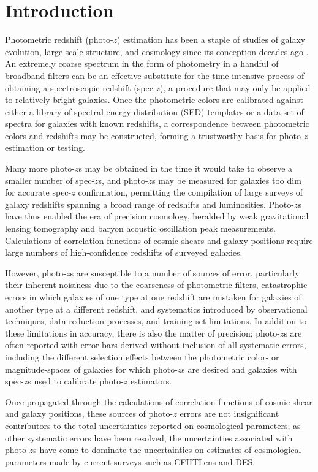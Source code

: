 \documentclass[preprint]{aastex}
\begin{document}
\section{Introduction}
\label{sec:intro}

Photometric redshift (photo-$z$) estimation has been a staple of studies of 
galaxy evolution, large-scale structure, and cosmology since its conception 
decades ago \citep{Baum1962}.  An extremely coarse spectrum in the form of 
photometry in a handful of broadband filters can be an effective substitute for 
the time-intensive process of obtaining a spectroscopic redshift (spec-$z$), a 
procedure that may only be applied to relatively bright galaxies.  Once the 
photometric colors are calibrated against either a library of spectral energy 
distribution (SED) templates or a data set of spectra for galaxies with known 
redshifts, a correspondence between photometric colors and redshifts may be 
constructed, forming a trustworthy basis for photo-$z$ estimation or testing.

Many more photo-$z$s may be obtained in the time it would take to observe a 
smaller number of spec-$z$s, and photo-$z$s may be measured for galaxies too 
dim for accurate spec-$z$ confirmation, permitting the compilation of large 
surveys of galaxy redshifts spanning a broad range of redshifts and 
luminosities.  Photo-$z$s have thus enabled the era of precision cosmology, 
heralded by weak gravitational lensing tomography and baryon acoustic 
oscillation peak measurements.  Calculations of correlation functions of cosmic 
shears and galaxy positions require large numbers of high-confidence redshifts 
of surveyed galaxies.  

However, photo-$z$s are susceptible to a number of sources of error, 
particularly their inherent noisiness due to the coarseness of photometric 
filters, catastrophic errors in which galaxies of one type at one redshift are 
mistaken for galaxies of another type at a different redshift, and systematics 
introduced by observational techniques, data reduction processes, and training 
set limitations.  In addition to these limitations in accuracy, there is also 
the matter of precision; photo-$z$s are often reported with error bars derived 
without inclusion of all systematic errors, including the different selection 
effects between the photometric color- or magnitude-spaces of galaxies for 
which photo-$z$s are desired and galaxies with spec-$z$s used to calibrate 
photo-$z$ estimators.

Once propagated through the calculations of correlation functions of cosmic 
shear and galaxy positions, these sources of photo-$z$ errors are not 
insignificant contributors to the total uncertainties reported on cosmological 
parameters; as other systematic errors have been resolved, the uncertainties 
associated with photo-$z$s have come to dominate the uncertainties on estimates 
of cosmological parameters made by current surveys such as CFHTLens and DES.
\end{document}
